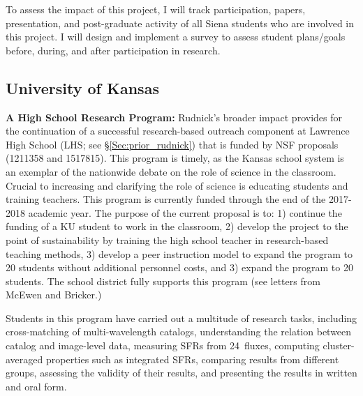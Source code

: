 \documentclass[11pt, preprint]{aastex}
\begin{document}
{To assess the impact of this project, I will track participation, papers, 
presentation, and post-graduate activity of all Siena students
who are involved in this project.  I will design and implement a survey to 
assess student plans/goals before, during, and after
participation in research.

\vspace*{-.8cm}
\subsection{University of Kansas}
\vspace*{-.4cm}
\label{BI}
\noindent \textbf{A High School Research Program:} Rudnick's broader
impact provides for the continuation of a successful research-based
outreach component at Lawrence High School (LHS; see
\S\ref{Sec:prior_rudnick}) that is funded by NSF proposals (1211358 and 1517815). This program is timely, as the Kansas
school system is an exemplar of the nationwide debate on the role of
science in the classroom. Crucial to increasing and clarifying the
role of science is educating students and training teachers.
This program is currently funded through the end of the 2017-2018
academic year. The purpose of the current proposal is to: 1) continue
the funding of a KU student to work in the classroom, 2) develop the
project to the point of sustainability by training the high school
teacher in research-based teaching methods, 3) develop a peer
instruction model to expand the program to 20 students without
additional personnel costs, and 3) expand the program to 20
students. The school district fully supports this program (see letters
from McEwen and Bricker.)

Students in this program have carried out a multitude of research tasks, including cross-matching of multi-wavelength catalogs, understanding the relation between catalog and image-level data, measuring SFRs from 24\micron\ fluxes, computing cluster-averaged properties such as integrated SFRs, comparing results from different groups, assessing the validity of their results, and presenting the results in written and oral form.

}
\end{document}
